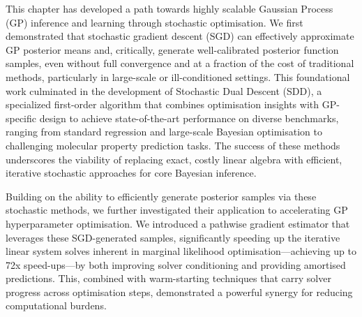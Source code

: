 This chapter has developed a path towards highly scalable Gaussian Process (GP) inference and learning through stochastic optimisation. We first demonstrated that stochastic gradient descent (SGD) can effectively approximate GP posterior means and, critically, generate well-calibrated posterior function samples, even without full convergence and at a fraction of the cost of traditional methods, particularly in large-scale or ill-conditioned settings. This foundational work culminated in the development of Stochastic Dual Descent (SDD), a specialized first-order algorithm that combines optimisation insights with GP-specific design to achieve state-of-the-art performance on diverse benchmarks, ranging from standard regression and large-scale Bayesian optimisation to challenging molecular property prediction tasks. The success of these methods underscores the viability of replacing exact, costly linear algebra with efficient, iterative stochastic approaches for core Bayesian inference.

Building on the ability to efficiently generate posterior samples via these stochastic methods, we further investigated their application to accelerating GP hyperparameter optimisation. We introduced a pathwise gradient estimator that leverages these SGD-generated samples, significantly speeding up the iterative linear system solves inherent in marginal likelihood optimisation—achieving up to 72x speed-ups—by both improving solver conditioning and providing amortised predictions. This, combined with warm-starting techniques that carry solver progress across optimisation steps, demonstrated a powerful synergy for reducing computational burdens. 